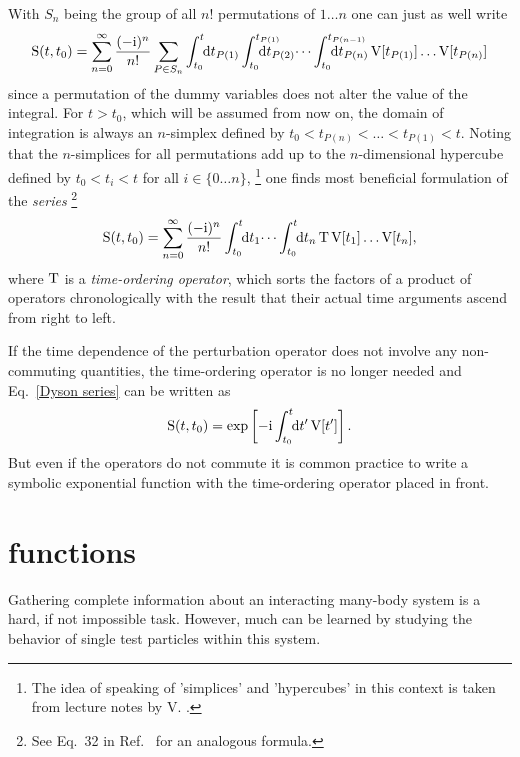 With $S_n$ being the group of all $n!$ permutations of $1 \dots n$ one can just
as well write
%
\begin{equation*}
    \op S(t, t_0) = \sum_{n = 0}^\infty \frac{(-\I)^n}{n!} \sum_{P \in S_n}
    \int \from{t_0} \till t \D t_{P(1)}
    \int \from{t_0} \till{t_{P(1)}} \D t_{P(2)} \dots
    \int \from{t_0} \till{t_{P(n - 1)}} \D t_{P(n)} \,
    \op V[t_{P(1)}] \dots \op V[t_{P(n)}]
\end{equation*}
%
since a permutation of the dummy variables does not alter the value of the
integral. For $t > t_0$, which will be assumed from now on, the domain of
integration is always an $n$-simplex defined by $t_0 < t_{P(n)} < \dots <
t_{P(1)} < t$. Noting that the $n$-simplices for all permutations add up to the
$n$-dimensional hypercube defined by $t_0 < t_i < t$ for all $i \in \{ 0 \dots n
\}$,%
%
\footnote{The idea of speaking of \q'simplices' and \q'hypercubes' in this
context is taken from lecture notes by V. .}
%
one finds most beneficial formulation of the \emph{ series}%
%
\footnote{See Eq.~32 in Ref.~ for an analogous formula.}
%
\begin{equation} \label{Dyson series}
    \op S(t, t_0) = \sum_{n = 0}^\infty \frac{(-\I)^n}{n!}
    \int \from{t_0} \till t \D t_1 \dots
    \int \from{t_0} \till t \D t_n \,
    \op T \, \op V[t_1] \dots \op V[t_n],
\end{equation}
%
where $\mathrm T$ is a \emph{time-ordering operator}, which sorts the factors of a
product of operators chronologically with the result that their actual time
arguments ascend from right to left.

If the time dependence of the perturbation operator does not involve any non-commuting quantities, the time-ordering operator is no longer needed and Eq.~\ref{Dyson series} can be written as
%
\begin{equation*}
    \op S(t, t_0) = \exp \left[
        -\I \int \from{t_0} \till t \D t' \, \op V[t'] \right].
\end{equation*}
%
But even if the operators do not commute it is common practice to write a
symbolic exponential function with the time-ordering operator placed in front.

\section{ functions}

Gathering complete information about an interacting many-body system is a hard,
if not impossible task. However, much can be learned by studying the behavior of
single test particles within this system.


